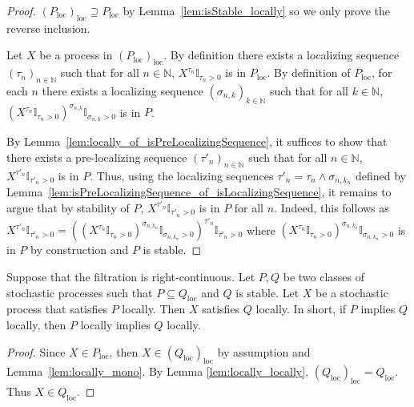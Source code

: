 \begin{proof}\leanok
$(P_{\mathrm{loc}})_{\mathrm{loc}} \supseteq P_{\mathrm{loc}}$ by Lemma~\ref{lem:isStable_locally} so we only prove the reverse inclusion.

Let $X$ be a process in $(P_{\mathrm{loc}})_{\mathrm{loc}}$.
By definition there exists a localizing sequence $(\tau_n)_{n \in \mathbb{N}}$ such that for all $n \in \mathbb{N}$, $X^{\tau_n}\mathbb{I}_{\tau_n > 0}$ is in $P_{\mathrm{loc}}$.
By definition of $P_{\mathrm{loc}}$, for each $n$ there exists a localizing sequence $(\sigma_{n,k})_{k \in \mathbb{N}}$ such that for all $k \in \mathbb{N}$, $(X^{\tau_n}\mathbb{I}_{\tau_n > 0})^{\sigma_{n,k}}\mathbb{I}_{\sigma_{n,k} > 0}$ is in $P$.

By Lemma~\ref{lem:locally_of_isPreLocalizingSequence}, it suffices to show that there exists a pre-localizing sequence $(\tau'_n)_{n \in \mathbb{N}}$ such that for all $n \in \mathbb{N}$, $X^{\tau'_n}\mathbb{I}_{\tau'_n > 0}$ is in $P$.
Thus, using the localizing sequences $\tau'_n = \tau_n \wedge \sigma_{n, k_n}$ defined by Lemma~\ref{lem:isPreLocalizingSequence_of_isLocalizingSequence},
it remains to argue that by stability of $P$, $X^{\tau'_n}\mathbb{I}_{\tau'_n > 0}$ is in $P$ for all $n$.
Indeed, this follows as $X^{\tau'_n}\mathbb{I}_{\tau'_n > 0} = ((X^{\tau_n}\mathbb{I}_{\tau_n > 0})^{\sigma_{n,k_n}}\mathbb{I}_{\sigma_{n,k_n} > 0})^{\tau'_n}\mathbb{I}_{\tau'_n > 0}$ where $(X^{\tau_n}\mathbb{I}_{\tau_n > 0})^{\sigma_{n,k_n}}\mathbb{I}_{\sigma_{n,k_n} > 0}$ is in $P$ by construction and $P$ is stable.
\end{proof}


\begin{lemma}\label{lem:local_induction}
  \mathlibok
Suppose that the filtration is right-continuous.
Let $P, Q$ be two classes of stochastic processes such that $P \subseteq Q_{\mathrm{loc}}$ and $Q$ is stable.
Let $X$ be a stochastic process that satisfies $P$ locally.
Then $X$ satisfies $Q$ locally.
In short, if $P$ implies $Q$ locally, then $P$ locally implies $Q$ locally.
\end{lemma}

\begin{proof}\leanok
Since $X \in P_{\mathrm{loc}}$, then $X \in (Q_{\mathrm{loc}})_{\mathrm{loc}}$ by assumption and Lemma~\ref{lem:locally_mono}.
By Lemma \ref{lem:locally_locally}, $(Q_{\mathrm{loc}})_{\mathrm{loc}} = Q_{\mathrm{loc}}$.
Thus $X \in Q_{\mathrm{loc}}$.
\end{proof}

